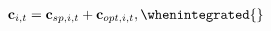  \begin{equation}
    \begin{gathered}
      \begin{aligned}
        \mathbf{c}_{i,t} & = \mathbf{c}_{sp,i,t} + \mathbf{c}_{opt,i,t}, \whenintegrated{\label{eq:model}} 
      \end{aligned}
    \end{gathered}
  \end{equation}
